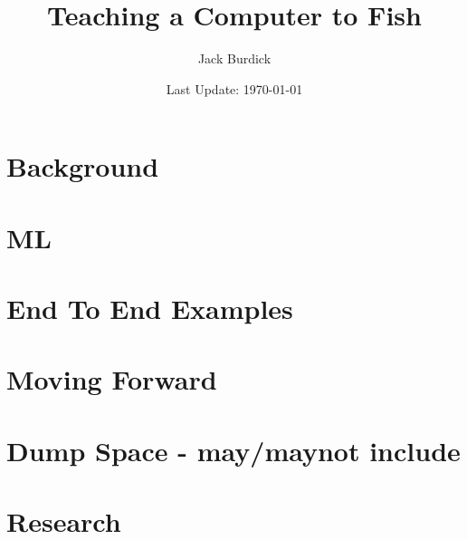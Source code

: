\documentclass[12pt]{book}
\title{Teaching a Computer to Fish}
\author{Jack Burdick}
\date{Last Update: \today} %
\begin{document}
 

\maketitle 

\tableofcontents

\part{Background}







\part{ML}









\part{End To End Examples}



\part{Moving Forward}


\part{Dump Space - may/maynot include}




\part{Research}
\end{document}
